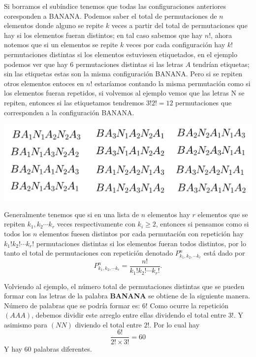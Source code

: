 Si borramos el subíndice tenemos que todas las configuraciones anteriores coresponden a BANANA. Podemos saber el total de permutaciones de $n$ elementos donde alguno se repite $k$ veces a partir del total de permutaciones que hay si los elementos fueran distintos; en tal caso sabemos que hay $n!$, ahora notemos que si un elementos se repite $k$ veces por cada configuración hay $k!$ permutaciones distintas si los elementos estuviesen etiquetados, en el ejemplo podemos ver que hay 6 permutaciones distintas si las letras $A$ tendrían etiquetas; sin las etiquetas estas son la misma configuración BANANA. Pero si se repiten otros elementos entoces en $n!$ estaríamos contando la misma permutación como si los elementos fueran repetidos, si volvemos al ejemplo vemos que las letras N se repiten, entonces si las etiquetamos tendremos $3! 2!=12$ permutaciones que corresponden a la configuración BANANA.

\begin{center}
    \includegraphics[scale=0.25]{Imagenes/IMG5/S1-5-04.png}
\end{center}

Generalmente tenemos que si en una lista de $n$ elementos hay $r$ elementos que se repiten $k_1, k_2\cdots k_r$ veces respectivamente con $k_i\geq 2$, entonces si pensamos como si todos los $n$ elementos fuesen distintos por cada permutación con repetición hay $k_1! k_2! \cdots k_r!$ permutaciones distintas si los elementos fueran todos distintos, por lo tanto el total de permutaciones con repetición denotado $P_{k_1, k_2, \cdots k_r}^n$ está dado por $$P_{k_1, k_2, \cdots k_r}^n=\dfrac{n!}{k_1! k_2! \cdots k_r!}.$$   

\begin{ejemplo}
Volviendo al ejemplo, el número total de permutaciones distintas que se pueden formar con las letras de la palabra \textbf{BANANA} se obtiene de la siguiente manera.  Número de palabras que se podría formar es: $6!$ 
Como ocurre la repetición $(AAA)$, debemos dividir este arreglo entre ellas dividendo el total entre 3!. Y asimismo para $(NN)$ diviendo el total entre $2!$. Por lo cual hay
\[\frac{6!}{2!\times 3!}=60\]
Y hay $60$ palabras diferentes.
\end{ejemplo}

